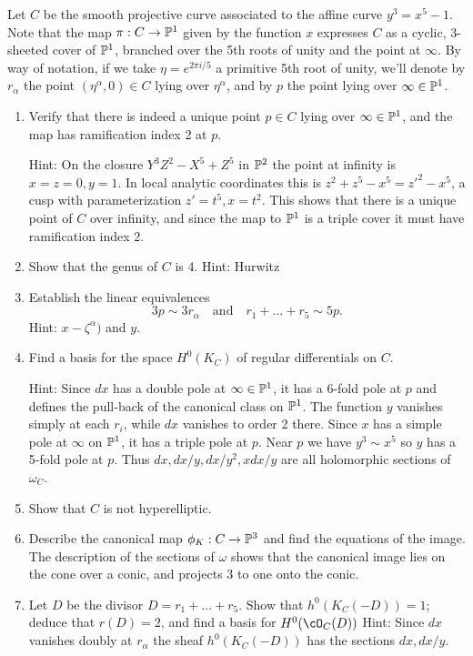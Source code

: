 \begin{exercise}
Let $C$ be the smooth projective curve associated to the affine curve 
$y^3 = x^5 -1$. 
Note that the map $\pi : C \to \PP^1$ given by the function $x$ expresses $C$ as a cyclic, 3-sheeted cover of $\PP^1$, branched over the 5th roots of unity and the point at $\infty$. By way of notation, if we take $\eta = e^{2\pi i/5}$ a primitive 5th root of unity, we'll denote by $r_\alpha$ the point $(\eta^\alpha, 0) \in C$ lying over $\eta^\alpha$, and by $p$ the point lying over $\infty \in \PP^1$.

\begin{enumerate}
\item Verify that there is indeed a unique point $p \in C$ lying over $\infty \in \PP^1$, and the map has ramification index 2 at $p$. 

Hint: On the closure  $Y^3Z^2-X^5+Z^5$ in $\PP^2$ the point at infinity is $x=z=0, y=1$. In local analytic coordinates this is
$z^2+z^5-x^5 = z'^2-x^5$, a cusp with parameterization $z'=t^5, x= t^2$. This shows that there is a unique point of $C$
over infinity, and since the map to $\PP^1$ is a triple cover it must have ramification index 2. 

\item Show that the genus of $C$ is 4. Hint: Hurwitz

\item Establish the linear equivalences
$$
3p \sim 3r_\alpha \quad \text{and} \quad r_1+ \dots + r_5 \sim 5p. 
$$
Hint: $x-\zeta^\alpha)$ and $y$.
\item Find a basis for the space $H^0(K_C)$ of regular differentials on $C$.

Hint: Since
$dx$ has a double pole at $\infty \in \PP^1$, it has a 6-fold pole at $p$ and defines the pull-back of the canonical
class on $\PP^1$. The function $y$ vanishes simply
at each $r_i$, while $dx$ vanishes to order 2 there.
Since $x$ has a simple pole at $\infty$ on $\PP^1$, it has a triple pole at $p$.
Near $p$ we have $y^3\sim x^5$ so $y$ has a 5-fold pole at $p$. Thus $dx, dx/y, dx/y^2, xdx/y$ are all holomorphic sections of $\omega_C$.

\item Show that $C$ is not hyperelliptic.
\item Describe the canonical map $\phi_K : C \to \PP^3$ and find the equations of the image.
The description of the sections of $\omega$  shows that the canonical image lies on the cone over a conic,
and projects 3 to one onto the conic.
\item Let $D$ be the divisor $D = r_1+\dots+r_5$. Show that $h^0(K_C(-D)) = 1$; deduce that $r(D) = 2$, and find a basis for $H^0(\cO_C(D))$
Hint:  Since $dx$ vanishes doubly at $r_\alpha$ the sheaf $h^0(K_C(-D))$ has the sections $dx, dx/y$.


\end{enumerate}
\end{exercise}
